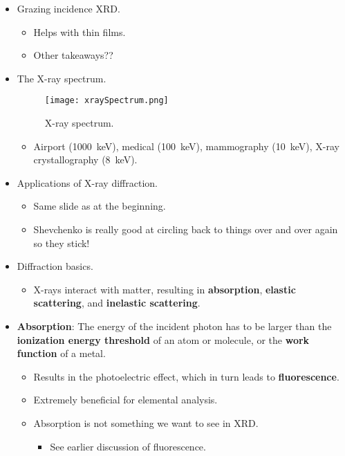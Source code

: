 \documentclass[../notes.tex]{subfiles}
\begin{document}
\begin{itemize}
    \item Grazing incidence XRD.
    \begin{itemize}
        \item Helps with thin films.
        \item Other takeaways??
    \end{itemize}
    \item The X-ray spectrum.
    \begin{figure}[h!]
        \centering
        \texttt{[image: xraySpectrum.png]}
        \caption{X-ray spectrum.}
        \label{fig:xraySpectrum}
    \end{figure}
    \begin{itemize}
        \item Airport (\SI{1000}{\kilo\electronvolt}), medical (\SI{100}{\kilo\electronvolt}), mammography (\SI{10}{\kilo\electronvolt}), X-ray crystallography (\SI{8}{\kilo\electronvolt}).
    \end{itemize}
    \item Applications of X-ray diffraction.
    \begin{itemize}
        \item Same slide as at the beginning.
        \item Shevchenko is really good at circling back to things over and over again so they stick!
    \end{itemize}
    \item Diffraction basics.
    \begin{itemize}
        \item X-rays interact with matter, resulting in \textbf{absorption}, \textbf{elastic scattering}, and \textbf{inelastic scattering}.
    \end{itemize}
    \item \textbf{Absorption}: The energy of the incident photon has to be larger than the \textbf{ionization energy threshold} of an atom or molecule, or the \textbf{work function} of a metal.
    \begin{itemize}
        \item Results in the photoelectric effect, which in turn leads to \textbf{fluorescence}.
        \item Extremely beneficial for elemental analysis.
        \item Absorption is not something we want to see in XRD.
        \begin{itemize}
            \item See earlier discussion of fluorescence.

\end{itemize}
\end{itemize}
\end{itemize}
\end{document}
